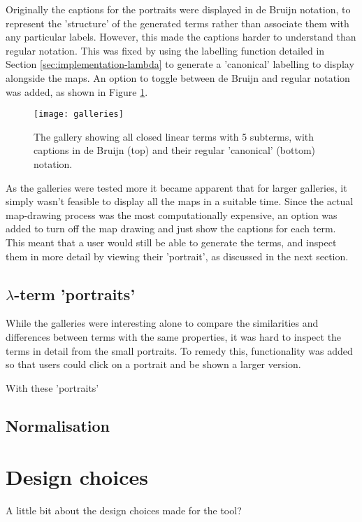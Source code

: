 \documentclass[11pt]{article}
\begin{document}
Originally the captions for the portraits were displayed in de Bruijn notation, to represent the 'structure' of the generated terms rather than associate them with any particular labels. However, this made the captions harder to understand than regular notation. This was fixed by using the labelling function detailed in Section \ref{sec:implementation-lambda} to generate a 'canonical' labelling to display alongside the maps. An option to toggle between de Bruijn and regular notation was added, as shown in Figure \ref{fig:galleries}.

\begin{figure}
    \centering
    \texttt{[image: galleries]}
    \caption{The gallery showing all closed linear terms with 5 subterms, with captions in de Bruijn (top) and their regular 'canonical' (bottom) notation.}
    \label{fig:galleries}
\end{figure}

As the galleries were tested more it became apparent that for larger galleries, it simply wasn't feasible to display all the maps in a suitable time. Since the actual map-drawing process was the most computationally expensive, an option was added to turn off the map drawing and just show the captions for each term. This meant that a user would still be able to generate the terms, and inspect them in more detail by viewing their 'portrait', as discussed in the next section. 

\subsection{\texorpdfstring{$\lambda$}{Lambda}-term 'portraits'}
While the galleries were interesting alone to compare the similarities and differences between terms with the same properties, it was hard to inspect the terms in detail from the small portraits. To remedy this, functionality was added so that users could click on a portrait and be shown a larger version. 

With these 'portraits' 


\subsection{Normalisation}

\newpage

\section{Design choices}
\label{sec:design}
A little bit about the design choices made for the tool?
\end{document}
